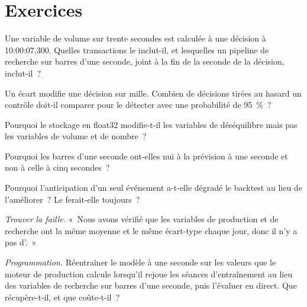 \section{Exercices}

\begin{exercise}[$\star$]\label{exo:ml:data-and-feature-stores:1}
Une variable de volume sur trente secondes est calculée à une décision à 10:00:07.300. Quelles transactions le  inclut-il, et lesquelles
un pipeline de recherche sur barres d'une seconde, joint à la fin de la seconde de la décision, inclut-il~?
\end{exercise}

\begin{exercise}[$\star$]\label{exo:ml:data-and-feature-stores:2}
Un écart modifie une décision sur mille. Combien de décisions tirées au hasard un contrôle doit-il comparer pour le détecter avec
une probabilité de 95~\%~?
\end{exercise}

\begin{exercise}[$\star$]\label{exo:ml:data-and-feature-stores:3}
Pourquoi le stockage en float32 modifie-t-il les variables de déséquilibre mais pas les variables de volume et de nombre~?
\end{exercise}

\begin{exercise}[$\star\star$]\label{exo:ml:data-and-feature-stores:4}
Pourquoi les barres d'une seconde ont-elles nui à la prévision à une seconde et non à celle à cinq secondes~?
\end{exercise}

\begin{exercise}[$\star\star$]\label{exo:ml:data-and-feature-stores:5}
Pourquoi l'anticipation d'un seul événement a-t-elle dégradé le backtest au lieu de l'améliorer~? Le ferait-elle toujours~?
\end{exercise}

\begin{exercise}[$\star\star$]\label{exo:ml:data-and-feature-stores:6}
\emph{Trouver la faille.} «~Nous avons vérifié que les variables de production et de recherche ont la même moyenne et le même écart-type chaque jour,
donc il n'y a pas d'.~»
\end{exercise}

\begin{exercise}[$\star\star\star$]\label{exo:ml:data-and-feature-stores:7}
\emph{Programmation.} Réentraîner le modèle à une seconde sur les valeurs que le moteur de production calcule lorsqu'il rejoue les séances d'entraînement
au lieu des variables de recherche sur barres d'une seconde, puis l'évaluer en direct. Que récupère-t-il, et que coûte-t-il~?
\end{exercise}

